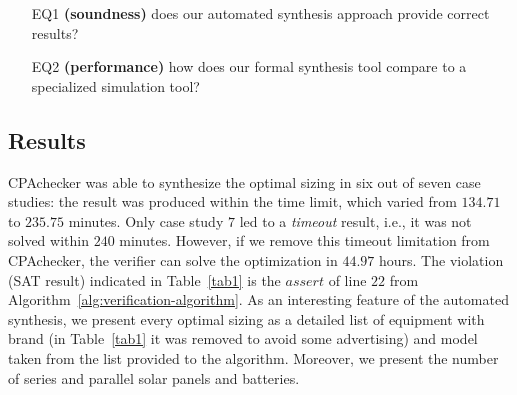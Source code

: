 \documentclass[journal]{IEEEtran}
\begin{document}
\begin{enumerate}

\item[EQ1] \textbf{(soundness)} does our automated synthesis approach provide correct results?

\item[EQ2] \textbf{(performance)} how does our formal synthesis tool compare to a specialized simulation tool?

\end{enumerate}

\subsection{Results}  

CPAchecker was able to synthesize the optimal sizing in six out of seven case studies: the result was produced within the time limit, which varied from $134.71$ to $235.75$ minutes. Only case study $7$ led to a \textit{timeout} result, i.e., it was not solved within $240$ minutes. However, if we remove this timeout limitation from CPAchecker, the verifier can solve the optimization in $44.97$ hours. The violation (SAT result) indicated in Table~\ref{tab1} is the $assert$ of line $22$ from Algorithm~\ref{alg:verification-algorithm}. As an interesting feature of the automated synthesis, we present every optimal sizing as a detailed list of equipment with brand (in Table~\ref{tab1} it was removed to avoid some advertising) and model taken from the list provided to the algorithm. Moreover, we present the number of series and parallel solar panels and batteries.
\end{document}
